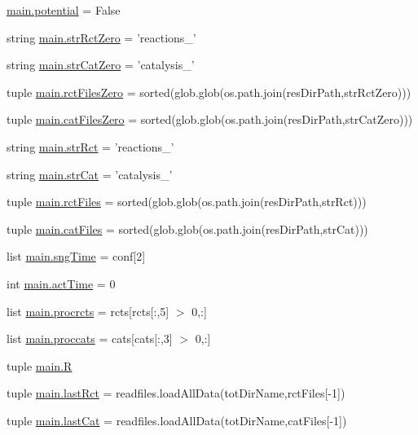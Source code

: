\begin{DoxyCompactItemize}
\item 
\hyperlink{a00153_abe4c267a63409b1b7cd9c6aaf0779b4a}{main.\+potential} = False
\item 
string \hyperlink{a00153_adbfa32333003aa707723362b43bc11ff}{main.\+str\+Rct\+Zero} = 'reactions\+\_\+'
\item 
string \hyperlink{a00153_a6bb1e2c0e0d0a9e63313c082ee4eec76}{main.\+str\+Cat\+Zero} = 'catalysis\+\_\+'
\item 
tuple \hyperlink{a00153_aa37eddd86a00bf98dff8cc9260d6d13b}{main.\+rct\+Files\+Zero} = sorted(glob.\+glob(os.\+path.\+join(res\+Dir\+Path,str\+Rct\+Zero)))
\item 
tuple \hyperlink{a00153_a7ab6089d577bd60acf22b92e84930523}{main.\+cat\+Files\+Zero} = sorted(glob.\+glob(os.\+path.\+join(res\+Dir\+Path,str\+Cat\+Zero)))
\item 
string \hyperlink{a00153_a28a37e653a4c0984df32f8d83c3596ff}{main.\+str\+Rct} = 'reactions\+\_\+'
\item 
string \hyperlink{a00153_ab12df661b7defb4d7077777ad7d6352d}{main.\+str\+Cat} = 'catalysis\+\_\+'
\item 
tuple \hyperlink{a00153_a9016a8f5eafe76e4e8dbb1bc3ce94af5}{main.\+rct\+Files} = sorted(glob.\+glob(os.\+path.\+join(res\+Dir\+Path,str\+Rct)))
\item 
tuple \hyperlink{a00153_a189dc9cf606d870dacab059d5e7dca24}{main.\+cat\+Files} = sorted(glob.\+glob(os.\+path.\+join(res\+Dir\+Path,str\+Cat)))
\item 
list \hyperlink{a00153_ab4296f1ae2e4c4bb597ca27e84849510}{main.\+sng\+Time} = conf\mbox{[}2\mbox{]}
\item 
int \hyperlink{a00153_a9c2013c88f8354ccf6504c51843f1d5e}{main.\+act\+Time} = 0
\item 
list \hyperlink{a00153_a2120e8355b3501aed0114a74091d56c1}{main.\+procrcts} = rcts\mbox{[}rcts\mbox{[}\+:,5\mbox{]} $>$ 0,\+:\mbox{]}
\item 
list \hyperlink{a00153_a4e3c4b627d098aef6c7905cb20683e07}{main.\+proccats} = cats\mbox{[}cats\mbox{[}\+:,3\mbox{]} $>$ 0,\+:\mbox{]}
\item 
tuple \hyperlink{a00153_a8a594014e054956af345eaa5e16bea0d}{main.\+R}
\item 
tuple \hyperlink{a00153_ad9cee9fada504bb0dab86df3a416232b}{main.\+last\+Rct} = readfiles.\+load\+All\+Data(tot\+Dir\+Name,rct\+Files\mbox{[}-\/1\mbox{]})
\item 
tuple \hyperlink{a00153_a1d69cc4251d83bb227555044baf27b86}{main.\+last\+Cat} = readfiles.\+load\+All\+Data(tot\+Dir\+Name,cat\+Files\mbox{[}-\/1\mbox{]})

\end{DoxyCompactItemize}
